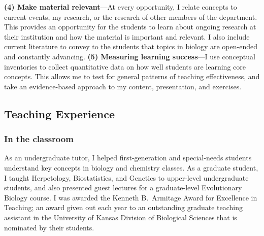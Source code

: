\textbf{(4) Make material relevant}---At every opportunity, I relate concepts
to current events, my research, or the research of other members of the
department.
This provides an opportunity for the students to learn about ongoing
research at their institution and how the material is important and relevant.
I also include current literature to convey to the students that topics in
biology are open-ended and constantly advancing.
\textbf{(5) Measuring learning success}---I use conceptual inventories to
collect quantitative data on how well students are learning core concepts.
This allows me to test for general patterns of teaching effectiveness, and take
an evidence-based approach to my content, presentation, and exercises.

\subsection*{Teaching Experience}
\subsubsection*{In the classroom}
As an undergraduate tutor, I helped first-generation and special-needs students
understand key concepts in biology and chemistry classes.
As a graduate student, I taught Herpetology, Biostatistics, and Genetics
to upper-level undergraduate students, and also presented guest lectures for a
graduate-level Evolutionary Biology course.
I was awarded the Kenneth B.\ Armitage Award for Excellence in Teaching; an
award given out each year to an outstanding graduate teaching assistant in the
University of Kansas Division of Biological Sciences that is nominated by their
students.

